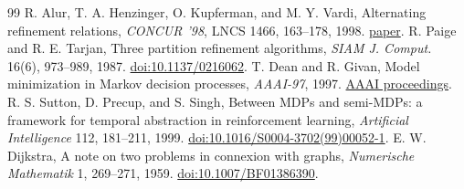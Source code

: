 \documentclass[11pt]{article}
\theoremstyle{remark}\newtheorem{remark}[theorem]{Remark}
\begin{document}
\begin{thebibliography}{99}
 R. Alur, T. A. Henzinger, O. Kupferman, and M. Y. Vardi, Alternating refinement relations, \emph{CONCUR '98}, LNCS 1466, 163--178, 1998. \href{https://www.cs.huji.ac.il/~ornak/publications/concur98.pdf}{paper}.
 R. Paige and R. E. Tarjan, Three partition refinement algorithms, \emph{SIAM J. Comput.} 16(6), 973--989, 1987. \href{https://epubs.siam.org/doi/abs/10.1137/0216062}{doi:10.1137/0216062}.
 T. Dean and R. Givan, Model minimization in Markov decision processes, \emph{AAAI-97}, 1997. \href{https://aiinternational.org/Library/AAAI/1997/aaai97-017.php}{AAAI proceedings}.
 R. S. Sutton, D. Precup, and S. Singh, Between MDPs and semi-MDPs: a framework for temporal abstraction in reinforcement learning, \emph{Artificial Intelligence} 112, 181--211, 1999. \href{https://doi.org/10.1016/S0004-3702(99)00052-1}{doi:10.1016/S0004-3702(99)00052-1}.
 E. W. Dijkstra, A note on two problems in connexion with graphs, \emph{Numerische Mathematik} 1, 269--271, 1959. \href{https://doi.org/10.1007/BF01386390}{doi:10.1007/BF01386390}.
\end{thebibliography}
\end{document}
